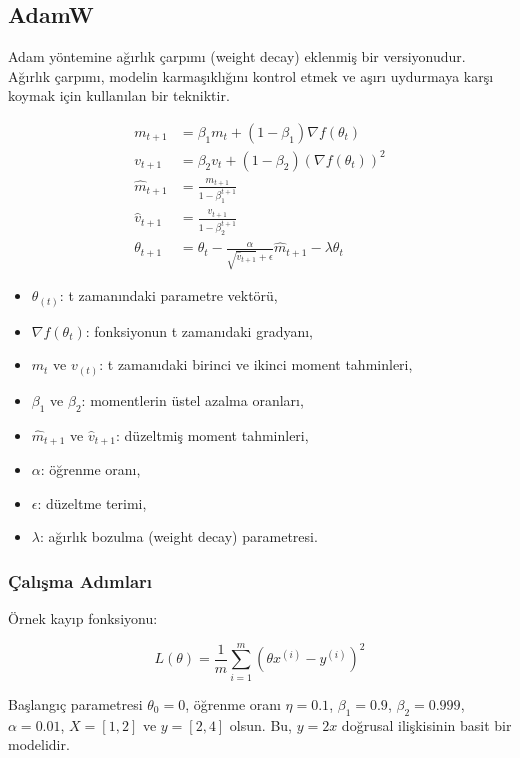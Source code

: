 \newpage

\subsection{AdamW}
Adam yöntemine ağırlık çarpımı (weight decay) eklenmiş bir versiyonudur. Ağırlık çarpımı, modelin karmaşıklığını kontrol etmek ve aşırı uydurmaya karşı koymak için kullanılan bir tekniktir.

\begin{align*}
m_{t+1} & = \beta_{1}m_{t} + (1 - \beta_{1})\nabla f(\theta_{t}) \\
v_{t+1} & = \beta_{2}v_{t} + (1 - \beta_{2})(\nabla f(\theta_{t}))^2 \\
\hat{m}_{t+1} & = \frac{m_{t+1}}{1 - \beta_{1}^{t+1}} \\
\hat{v}_{t+1} & = \frac{v_{t+1}}{1 - \beta_{2}^{t+1}} \\
\theta_{t+1} & = \theta_{t} - \frac{\alpha}{\sqrt{\hat{v}_{t+1}} + \epsilon} \hat{m}_{t+1} - \lambda \theta_{t}
\end{align*}

\begin{itemize}
	\item $\theta_(t)$: t zamanındaki parametre vektörü,
	\item $\nabla f(\theta_{t})$: fonksiyonun t zamanıdaki gradyanı,
	\item $m_{t}$ ve $v_(t)$: t zamanıdaki birinci ve ikinci moment tahminleri,
	\item $\beta_{1}$ ve $\beta_{2}$: momentlerin üstel azalma oranları,
	\item $\hat{m}_{t+1}$ ve $\hat{v}_{t+1}$: düzeltmiş moment tahminleri,
	\item $\alpha$: öğrenme oranı,
	\item $\epsilon$: düzeltme terimi,
	\item $\lambda$: ağırlık bozulma (weight decay) parametresi.
\end{itemize}

\subsubsection{Çalışma Adımları}

Örnek kayıp fonksiyonu:

\[ L(\theta) = \frac{1}{m} \sum_{i=1}^{m} (\theta x^{(i)} - y^{(i)})^2 \]

Başlangıç parametresi $\theta_0 = 0$, öğrenme oranı $\eta = 0.1$, $\beta_1 = 0.9$, $\beta_2 = 0.999$, $\alpha = 0.01$,  $X = [1, 2]$ ve $y = [2, 4]$ olsun. Bu, $y = 2x$ doğrusal ilişkisinin basit bir modelidir.

